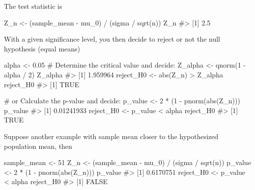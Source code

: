 \documentclass[
  letterpaper,
  DIV=11,
  numbers=noendperiod]{scrreprt}
\newenvironment{Shaded}{\begin{snugshade}}{\end{snugshade}}
\newcommand{\CommentTok}[1]{\textcolor[rgb]{0.37,0.37,0.37}{#1}}
\newcommand{\DecValTok}[1]{\textcolor[rgb]{0.68,0.00,0.00}{#1}}
\newcommand{\FloatTok}[1]{\textcolor[rgb]{0.68,0.00,0.00}{#1}}
\newcommand{\FunctionTok}[1]{\textcolor[rgb]{0.28,0.35,0.67}{#1}}
\newcommand{\NormalTok}[1]{\textcolor[rgb]{0.00,0.23,0.31}{#1}}
\newcommand{\OtherTok}[1]{\textcolor[rgb]{0.00,0.23,0.31}{#1}}
\newcommand{\SpecialCharTok}[1]{\textcolor[rgb]{0.37,0.37,0.37}{#1}}
\begin{document}
The test statistic is

\begin{Shaded}
\begin{Highlighting}[]
\NormalTok{Z\_n }\OtherTok{\textless{}{-}}\NormalTok{ (sample\_mean }\SpecialCharTok{{-}}\NormalTok{ mu\_0) }\SpecialCharTok{/}\NormalTok{ (sigma }\SpecialCharTok{/} \FunctionTok{sqrt}\NormalTok{(n))}
\NormalTok{Z\_n}
\CommentTok{\#\textgreater{} [1] 2.5}
\end{Highlighting}
\end{Shaded}

With a given significance level, you then decide to reject or not the
null hypothesis (equal means)

\begin{Shaded}
\begin{Highlighting}[]
\NormalTok{alpha }\OtherTok{\textless{}{-}} \FloatTok{0.05}
\CommentTok{\# Determine the critical value and decide:}
\NormalTok{Z\_alpha }\OtherTok{\textless{}{-}} \FunctionTok{qnorm}\NormalTok{(}\DecValTok{1} \SpecialCharTok{{-}}\NormalTok{ alpha }\SpecialCharTok{/} \DecValTok{2}\NormalTok{)}
\NormalTok{Z\_alpha}
\CommentTok{\#\textgreater{} [1] 1.959964}
\NormalTok{reject\_H0 }\OtherTok{\textless{}{-}} \FunctionTok{abs}\NormalTok{(Z\_n) }\SpecialCharTok{\textgreater{}}\NormalTok{ Z\_alpha}
\NormalTok{reject\_H0}
\CommentTok{\#\textgreater{} [1] TRUE}

\CommentTok{\# or Calculate the p{-}value and decide:}
\NormalTok{p\_value }\OtherTok{\textless{}{-}} \DecValTok{2} \SpecialCharTok{*}\NormalTok{ (}\DecValTok{1} \SpecialCharTok{{-}} \FunctionTok{pnorm}\NormalTok{(}\FunctionTok{abs}\NormalTok{(Z\_n)))}
\NormalTok{p\_value}
\CommentTok{\#\textgreater{} [1] 0.01241933}
\NormalTok{reject\_H0 }\OtherTok{\textless{}{-}}\NormalTok{ p\_value }\SpecialCharTok{\textless{}}\NormalTok{ alpha}
\NormalTok{reject\_H0}
\CommentTok{\#\textgreater{} [1] TRUE}
\end{Highlighting}
\end{Shaded}

Suppose another example with sample mean closer to the hypothesized
population mean, then

\begin{Shaded}
\begin{Highlighting}[]
\NormalTok{sample\_mean }\OtherTok{\textless{}{-}} \DecValTok{51}
\NormalTok{Z\_n }\OtherTok{\textless{}{-}}\NormalTok{ (sample\_mean }\SpecialCharTok{{-}}\NormalTok{ mu\_0) }\SpecialCharTok{/}\NormalTok{ (sigma }\SpecialCharTok{/} \FunctionTok{sqrt}\NormalTok{(n))}
\NormalTok{p\_value }\OtherTok{\textless{}{-}} \DecValTok{2} \SpecialCharTok{*}\NormalTok{ (}\DecValTok{1} \SpecialCharTok{{-}} \FunctionTok{pnorm}\NormalTok{(}\FunctionTok{abs}\NormalTok{(Z\_n)))}
\NormalTok{p\_value}
\CommentTok{\#\textgreater{} [1] 0.6170751}
\NormalTok{reject\_H0 }\OtherTok{\textless{}{-}}\NormalTok{ p\_value }\SpecialCharTok{\textless{}}\NormalTok{ alpha}
\NormalTok{reject\_H0}
\CommentTok{\#\textgreater{} [1] FALSE}
\end{Highlighting}
\end{Shaded}
\end{document}
